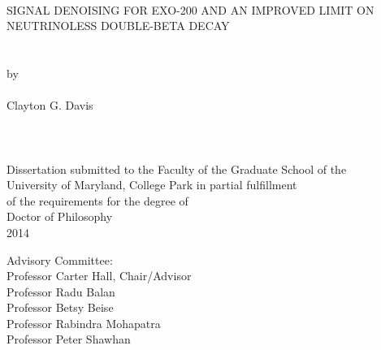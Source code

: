 
\thispagestyle{empty}
\hbox{\ }
\vspace{1in}
\renewcommand{\baselinestretch}{1}
\small\normalsize
\begin{center}

\large{{SIGNAL DENOISING FOR EXO-200 AND AN IMPROVED LIMIT ON NEUTRINOLESS DOUBLE-BETA DECAY}}\\
\ \\
\ \\
\large{by} \\
\ \\
\large{Clayton G. Davis}%
\ \\
\ \\
\ \\
\ \\
\normalsize
Dissertation submitted to the Faculty of the Graduate School of the \\
University of Maryland, College Park in partial fulfillment \\
of the requirements for the degree of \\
Doctor of Philosophy \\
2014
\end{center}

\vspace{7.5em}

\noindent Advisory Committee: \\
Professor Carter Hall, Chair/Advisor \\
Professor Radu Balan \\
Professor Betsy Beise \\
Professor Rabindra Mohapatra \\
Professor Peter Shawhan
